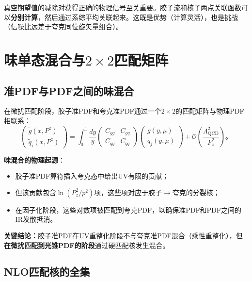 \documentclass[12pt,a4paper]{ctexart}
\theoremstyle{definition}
\begin{document}
真空期望值的减除对获得正确的物理信号至关重要。胶子流和核子两点关联函数可以\textbf{分别计算}，然后通过系综平均关联起来。这既是优势（计算灵活），也是挑战（信噪比远差于夸克同位旋矢量组合）。

\section{味单态混合与$2\times2$匹配矩阵}

\subsection{准PDF与PDF之间的味混合}

在微扰匹配阶段，胶子准PDF和夸克准PDF通过一个$2\times2$的匹配矩阵与物理PDF相联系\cite{Zhang2019,Yao2023}：
\begin{equation}
\begin{pmatrix} \tilde{g}(x, P^z) \\ \tilde{q}_i(x, P^z) \end{pmatrix} =
\int_0^1 \frac{dy}{y}
\begin{pmatrix} C_{gg} & C_{gq} \\ C_{qg} & C_{qq} \end{pmatrix}
\begin{pmatrix} g(y, \mu) \\ q_j(y, \mu) \end{pmatrix} + \mathcal{O}\left(\frac{\Lambda^2_{\text{QCD}}}{P_z^2}\right)。
\label{eq:2x2_matching}
\end{equation}

\textbf{味混合的物理起源}\cite{Zhang2019,Li2018multiplicative}：
\begin{itemize}
    \item 胶子准PDF算符插入夸克态中给出UV有限的贡献；
    \item 但该贡献包含$\ln(P^2_z/p^2)$项，这些项对应于胶子$\to$夸克的分裂核；
    \item 在因子化阶段，这些对数项被匹配到夸克PDF，以确保准PDF和PDF之间的IR发散抵消。
\end{itemize}

\textbf{关键结论：}胶子准PDF在UV重整化阶段不与夸克准PDF混合（乘性重整化），但\textbf{在微扰匹配到光锥PDF的阶段}通过硬匹配核发生混合\cite{Zhang2019}。

\subsection{NLO匹配核的全集}
\end{document}
